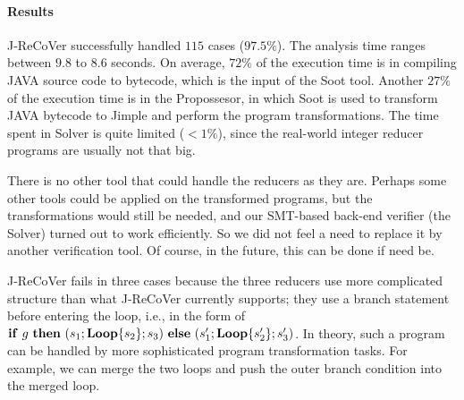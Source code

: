 \documentclass{llncs}
\newcommand{\ite}[3]{
	 \ifmmode
	 \mathbf{if}\ #1 \ \mathbf{then}\ #2\  \mathbf{else}\ #3
	 \else
	 \textbf{if}\ #1 \ \textbf{then}\ #2\  \textbf{else}\ #3
	 \fi}
\newcommand{\rloop}{
	\ifmmode
	\mathbf{Loop}
	\else
	\textbf{Loop}
	\fi}
\begin{document}
\paragraph*{Results} J-ReCoVer successfully handled $115$ cases ($97.5\%$). The analysis time ranges between $9.8$ to $8.6$ seconds. 
On average, $72\%$ of the execution time is in compiling JAVA source code to bytecode, which is the input of the Soot tool. Another $27\%$ of the execution time is in the Propossesor, in which Soot is used to transform JAVA bytecode to Jimple and perform the program transformations. The time spent in Solver is quite limited ($<1\%$), since the real-world integer reducer programs are usually not that big. 

There is no other tool that could handle the reducers as they are. Perhaps some other tools could be applied on the transformed programs, but the transformations would still be needed, and our SMT-based back-end verifier (the Solver) turned out to work efficiently. So we did not feel a need to replace it by another verification tool. Of course, in the future, this can be done if need be.

J-ReCoVer fails in three cases because the three reducers use more complicated structure than what J-ReCoVer currently supports; they use a branch statement before entering the loop, i.e., in the form of  $\ite{g}{(s_1;\rloop\{s_2\};s_3)}{(s'_1;\rloop\{s'_2\};s'_3)}$. In theory, such a program can be handled by more sophisticated program transformation tasks. For example, we can merge the two loops and push the outer branch condition into the merged loop.

 
\end{document}

